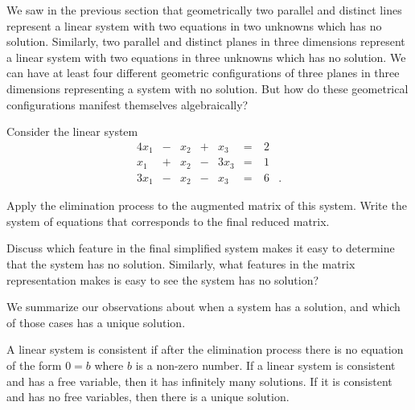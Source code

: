 
We saw in the previous section that geometrically two parallel and distinct lines represent a linear system with two equations in two unknowns which has no solution. Similarly, two parallel and distinct planes in three dimensions represent a linear system with two equations in three unknowns which has no solution. We can have at least four different geometric configurations of three planes in three dimensions representing a system with no solution. But how do these geometrical configurations manifest themselves algebraically? 

\begin{activity} Consider the linear system
\begin{alignat*}{4}
x_1 		&{}-{}	&x_2 	&{}+{}	&{}x_3	&{}={} & \ 2 &{} \\
x_1		&{}+{}	&x_2	&{}-{}	&{3}x_3	&{}={} & \ 1 &{} \\
{3}x_1	&{}-{}	&x_2	&{}-{}	&{}x_3	&{}={}	& \ 6 &{.}
\end{alignat*}

\ba 
\item Apply the elimination process to the augmented matrix of this system. Write the system of equations that corresponds to the final reduced matrix. 



\item Discuss which feature in the final simplified system makes it easy to determine that the system has no solution. Similarly, what features in the matrix representation makes is easy to see the system has no solution?



\ea

\end{activity}

We summarize our observations about when a system has a solution, and which of those cases has a unique solution.

\begin{theorem}
A linear system is consistent if after the elimination process there is no equation of the form $0=b$ where $b$ is a non-zero number. If a linear system is consistent and has a free variable, then it has infinitely many solutions. If it is consistent and has no free variables, then there is a unique solution.
\end{theorem}




